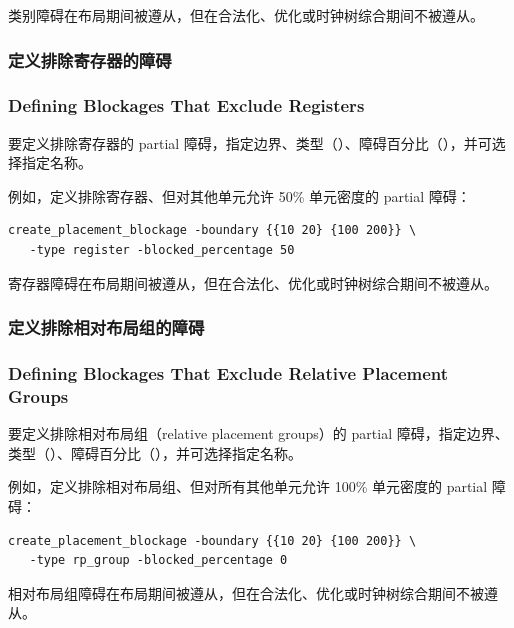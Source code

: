 \begin{noteBox}
类别障碍在布局期间被遵从，但在合法化、优化或时钟树综合期间不被遵从。
\end{noteBox}

\subsubsection{定义排除寄存器的障碍}
\subsubsection*{Defining Blockages That Exclude Registers}

要定义排除寄存器的 partial 障碍，指定边界、类型（）、障碍百分比（），并可选择指定名称。

例如，定义排除寄存器、但对其他单元允许 50\% 单元密度的 partial 障碍：
\begin{lstlisting}
create_placement_blockage -boundary {{10 20} {100 200}} \
   -type register -blocked_percentage 50
\end{lstlisting}

\begin{noteBox}
寄存器障碍在布局期间被遵从，但在合法化、优化或时钟树综合期间不被遵从。
\end{noteBox}

\subsubsection{定义排除相对布局组的障碍}
\subsubsection*{Defining Blockages That Exclude Relative Placement Groups}

要定义排除相对布局组（relative placement groups）的 partial 障碍，指定边界、类型（）、障碍百分比（），并可选择指定名称。

例如，定义排除相对布局组、但对所有其他单元允许 100\% 单元密度的 partial 障碍：
\begin{lstlisting}
create_placement_blockage -boundary {{10 20} {100 200}} \
   -type rp_group -blocked_percentage 0
\end{lstlisting}

\begin{noteBox}
相对布局组障碍在布局期间被遵从，但在合法化、优化或时钟树综合期间不被遵从。
\end{noteBox}

